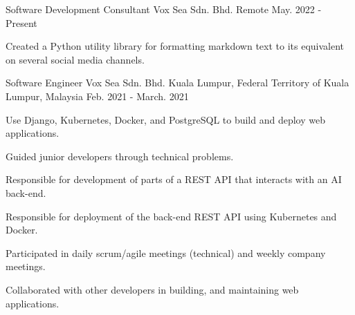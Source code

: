 

\begin{cventries}

  \cventry
    {Software Development Consultant} %
    {Vox Sea Sdn. Bhd.} %
    {Remote} %
    {May. 2022 - Present} %
    {
      \begin{cvitems} %
        \item {Created a Python utility library for formatting markdown text to its equivalent on several social media channels.}
      \end{cvitems}
    }

  \cventry
    {Software Engineer} %
    {Vox Sea Sdn. Bhd.} %
    {Kuala Lumpur, Federal Territory of Kuala Lumpur, Malaysia} %
    {Feb. 2021 - March. 2021} %
    {
      \begin{cvitems} %
        \item {Use Django, Kubernetes, Docker, and PostgreSQL to build and deploy web applications.}
        \item {Guided junior developers through technical problems.}
        \item {Responsible for development of parts of a REST API that interacts with an AI back-end.}
        \item {Responsible for deployment of the back-end REST API using Kubernetes and Docker.}
        \item {Participated in daily scrum/agile meetings (technical) and weekly company meetings.}
        \item {Collaborated with other developers in building, and maintaining web applications.}
      \end{cvitems}
    }


\end{cventries}
